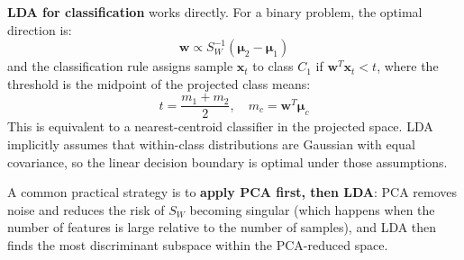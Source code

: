 \textbf{LDA for classification} works directly. For a binary problem, the optimal direction is:
\[
\mathbf{w} \propto S_W^{-1}(\boldsymbol{\mu}_2 - \boldsymbol{\mu}_1)
\]
and the classification rule assigns sample $\mathbf{x}_t$ to class $C_1$ if $\mathbf{w}^T\mathbf{x}_t < t$, where the threshold is the midpoint of the projected class means:
\[
t = \frac{m_1 + m_2}{2}, \quad m_c = \mathbf{w}^T\boldsymbol{\mu}_c
\]
This is equivalent to a nearest-centroid classifier in the projected space. LDA implicitly assumes that within-class distributions are Gaussian with equal covariance, so the linear decision boundary is optimal under those assumptions.

A common practical strategy is to \textbf{apply PCA first, then LDA}: PCA removes noise and reduces the risk of $S_W$ becoming singular (which happens when the number of features is large relative to the number of samples), and LDA then finds the most discriminant subspace within the PCA-reduced space.
